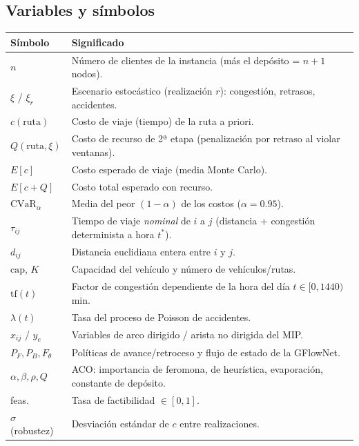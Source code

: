 \documentclass[11pt,a4paper]{article}
\begin{document}
\subsection*{Variables y símbolos}
\begin{longtable}{p{2.6cm}p{12.5cm}}
  \toprule
  \textbf{Símbolo} & \textbf{Significado}\\
  \midrule
  \endhead
  $n$ & Número de clientes de la instancia (más el depósito = $n{+}1$ nodos).\\
  $\xi$ / $\xi_r$ & Escenario estocástico (realización $r$): congestión, retrasos, accidentes.\\
  $c(\text{ruta})$ & Costo de viaje (tiempo) de la ruta a priori.\\
  $Q(\text{ruta},\xi)$ & Costo de recurso de 2ª etapa (penalización por retraso al violar ventanas).\\
  $E[c]$ & Costo esperado de viaje (media Monte Carlo).\\
  $E[c{+}Q]$ & Costo total esperado con recurso.\\
  $\text{CVaR}_\alpha$ & Media del peor $(1{-}\alpha)$ de los costos ($\alpha=0.95$).\\
  $\tau_{ij}$ & Tiempo de viaje \emph{nominal} de $i$ a $j$ (distancia + congestión determinista a hora $t^\ast$).\\
  $d_{ij}$ & Distancia euclidiana entera entre $i$ y $j$.\\
  $\text{cap}$, $K$ & Capacidad del vehículo y número de vehículos/rutas.\\
  $\text{tf}(t)$ & Factor de congestión dependiente de la hora del día $t\in[0,1440)$ min.\\
  $\lambda(t)$ & Tasa del proceso de Poisson de accidentes.\\
  $x_{ij}$ / $y_{e}$ & Variables de arco dirigido / arista no dirigida del MIP.\\
  $P_F, P_B, F_\theta$ & Políticas de avance/retroceso y flujo de estado de la GFlowNet.\\
  $\alpha,\beta,\rho,Q$ & ACO: importancia de feromona, de heurística, evaporación, constante de depósito.\\
  feas. & Tasa de factibilidad $\in[0,1]$.\\
  $\sigma$ (robustez) & Desviación estándar de $c$ entre realizaciones.\\
  \bottomrule
\end{longtable}
\end{document}
